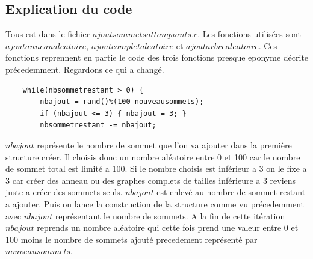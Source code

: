 \documentclass[a4paper,11pt]{article}
\begin{document}
	\subsection{Explication du code}
		Tous est dans le fichier $ajoutsommetsattanquants.c$. Les fonctions utilisées sont $ajoutanneaualeatoire$, $ajoutcompletaleatoire$
		et $ajoutarbrealeatoire$. Ces fonctions reprennent en partie le code des trois fonctions presque eponyme décrite précedemment.
		Regardons ce qui a changé. 
		\begin{lstlisting}
	while(nbsommetrestant > 0) {
		nbajout = rand()%(100-nouveausommets);
		if (nbajout <= 3) { nbajout = 3; }
		nbsommetrestant -= nbajout;
		\end{lstlisting}
		$nbajout$ représente le nombre de sommet que l'on va ajouter dans la première structure créer. Il choisis donc un nombre 
		aléatoire entre 0 et 100 car le nombre de sommet total est limité a 100. Si le nombre choisis est inférieur a 3 on le fixe a 3 car créer
		des anneau ou des graphes complets de tailles inférieure a 3 reviens juste a créer des sommets seuls.
		$nbajout$ est enlevé au nombre de sommet restant a ajouter. Puis on lance la construction de la structure comme vu précedemment 
		avec $nbajout$ représentant le nombre de sommets. A la fin de cette itération $nbajout$ reprends un nombre aléatoire qui cette fois
		prend une valeur entre 0 et 100 moins le nombre de sommets ajouté precedement représenté par $nouveausommets$.
\end{document}
